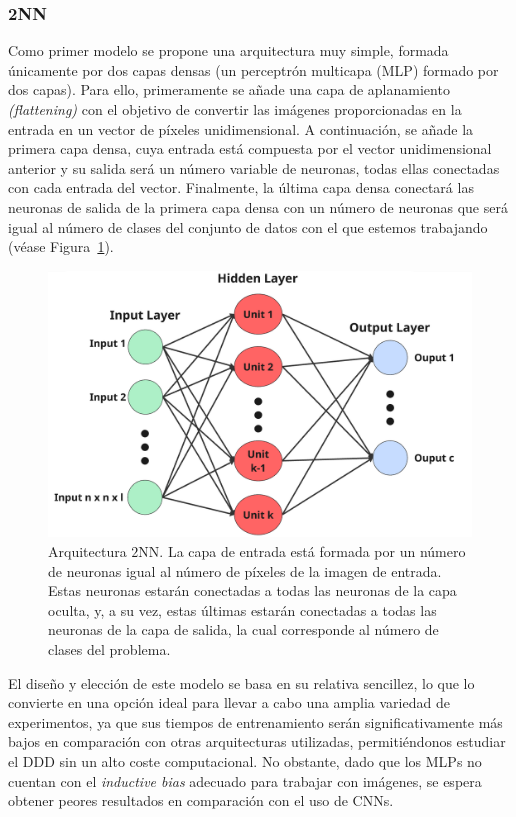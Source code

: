 \subsubsection{2NN}\label{subsubsec:2NN}

Como primer modelo se propone una arquitectura muy simple, formada únicamente por dos capas densas (un perceptrón multicapa (MLP) formado por dos capas). Para ello, primeramente se añade una capa de aplanamiento \textit{(flattening)} con el objetivo de convertir las imágenes proporcionadas en la entrada en un vector de píxeles unidimensional. A continuación, se añade la primera capa densa, cuya entrada está compuesta por el vector unidimensional anterior y su salida será un número variable de neuronas, todas ellas conectadas con cada entrada del vector. Finalmente, la última capa densa conectará las neuronas de salida de la primera capa densa con un número de neuronas que será igual al número de clases del conjunto de datos con el que estemos trabajando (véase Figura~\ref{fig:arquitecura2nn}).

\begin{figure}[h]
    \centering
    \includegraphics[width=0.6\linewidth]{img/arquitectura2nn.png}
    \caption[Arquitectura $2$NN.]{Arquitectura $2$NN. La capa de entrada está formada por un número de neuronas igual al número de píxeles de la imagen de entrada. Estas neuronas estarán conectadas a todas las neuronas de la capa oculta, y, a su vez, estas últimas estarán conectadas a todas las neuronas de la capa de salida, la cual corresponde al número de clases del problema.}\label{fig:arquitecura2nn}
\end{figure}

El diseño y elección de este modelo se basa en su relativa sencillez, lo que lo convierte en una opción ideal para llevar a cabo una amplia variedad de experimentos, ya que sus tiempos de entrenamiento serán significativamente más bajos en comparación con otras arquitecturas utilizadas, permitiéndonos estudiar el DDD sin un alto coste computacional. No obstante, dado que los MLPs no cuentan con el \textit{inductive bias} adecuado para trabajar con imágenes, se espera obtener peores resultados en comparación con el uso de CNNs.

